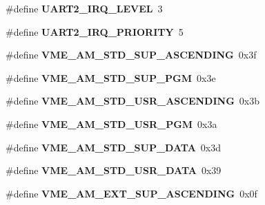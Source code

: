 \begin{DoxyCompactItemize}
\#define {\bfseries U\+A\+R\+T2\+\_\+\+I\+R\+Q\+\_\+\+L\+E\+V\+EL}~3
\item 
\mbox{\label{group__RTEMSBSPsM68kUC5282_gabe7562294780b56d1dd0e8cc91df557e}} 
\#define {\bfseries U\+A\+R\+T2\+\_\+\+I\+R\+Q\+\_\+\+P\+R\+I\+O\+R\+I\+TY}~5
\item 
\mbox{\label{group__RTEMSBSPsM68kUC5282_gaafd8fdb986cc9b5702467b6a1b850a2c}} 
\#define {\bfseries V\+M\+E\+\_\+\+A\+M\+\_\+\+S\+T\+D\+\_\+\+S\+U\+P\+\_\+\+A\+S\+C\+E\+N\+D\+I\+NG}~0x3f
\item 
\mbox{\label{group__RTEMSBSPsM68kUC5282_ga69cfec3aceca0eb50fcb2c7709fa5813}} 
\#define {\bfseries V\+M\+E\+\_\+\+A\+M\+\_\+\+S\+T\+D\+\_\+\+S\+U\+P\+\_\+\+P\+GM}~0x3e
\item 
\mbox{\label{group__RTEMSBSPsM68kUC5282_gacfa3d1d4ded7d8c260cac624e0961fc3}} 
\#define {\bfseries V\+M\+E\+\_\+\+A\+M\+\_\+\+S\+T\+D\+\_\+\+U\+S\+R\+\_\+\+A\+S\+C\+E\+N\+D\+I\+NG}~0x3b
\item 
\mbox{\label{group__RTEMSBSPsM68kUC5282_ga7f44a9cd85fd3ef20e4c21b4375f39ad}} 
\#define {\bfseries V\+M\+E\+\_\+\+A\+M\+\_\+\+S\+T\+D\+\_\+\+U\+S\+R\+\_\+\+P\+GM}~0x3a
\item 
\mbox{\label{group__RTEMSBSPsM68kUC5282_gab5690987e7af533794038ee246c0a0ad}} 
\#define {\bfseries V\+M\+E\+\_\+\+A\+M\+\_\+\+S\+T\+D\+\_\+\+S\+U\+P\+\_\+\+D\+A\+TA}~0x3d
\item 
\mbox{\label{group__RTEMSBSPsM68kUC5282_ga0fd7c2840381ff28daa697e31c758842}} 
\#define {\bfseries V\+M\+E\+\_\+\+A\+M\+\_\+\+S\+T\+D\+\_\+\+U\+S\+R\+\_\+\+D\+A\+TA}~0x39
\item 
\mbox{\label{group__RTEMSBSPsM68kUC5282_gafb98623b8326af6c27d7fadef387118e}} 
\#define {\bfseries V\+M\+E\+\_\+\+A\+M\+\_\+\+E\+X\+T\+\_\+\+S\+U\+P\+\_\+\+A\+S\+C\+E\+N\+D\+I\+NG}~0x0f
\item 
\mbox{\label{group__RTEMSBSPsM68kUC5282_gaefa48b9c2199257911f79c60d80db376}} 

\end{DoxyCompactItemize}
